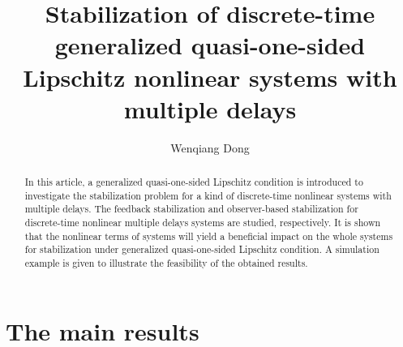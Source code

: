 \documentclass[12pt]{llncs}
\begin{document}
\fi

\title{Stabilization of discrete-time generalized quasi-one-sided Lipschitz nonlinear systems with multiple delays}

\author{Wenqiang Dong
}


\maketitle

\begin{abstract}
In this article, a generalized quasi-one-sided Lipschitz condition is introduced to investigate the stabilization problem for a kind of discrete-time nonlinear systems with multiple delays. The feedback stabilization and observer-based stabilization for discrete-time nonlinear multiple delays systems are studied, respectively. It is shown that the nonlinear terms of systems will yield a beneficial impact on the whole systems for stabilization under generalized quasi-one-sided Lipschitz condition. A simulation example is given to illustrate the feasibility of the obtained results.
\end{abstract}

\section{The main results} %
\end{document}
